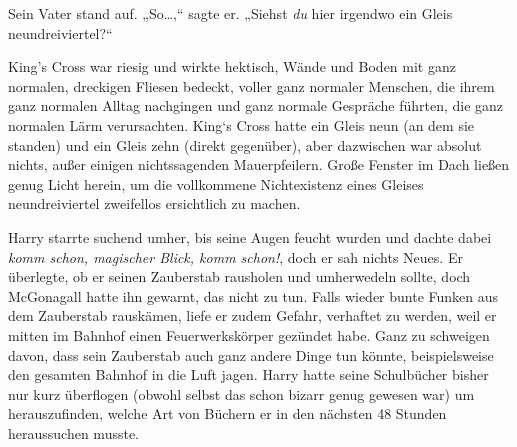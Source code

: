 Sein Vater stand auf. „So…,“ sagte er. „Siehst \emph{du} hier irgendwo ein Gleis neundreiviertel?“

King’s Cross war riesig und wirkte hektisch, Wände und Boden mit ganz normalen, dreckigen Fliesen bedeckt, voller ganz normaler Menschen, die ihrem ganz normalen Alltag nachgingen und ganz normale Gespräche führten, die ganz normalen Lärm verursachten. King‘s Cross hatte ein Gleis neun (an dem sie standen) und ein Gleis zehn (direkt gegenüber), aber dazwischen war absolut nichts, außer einigen nichtssagenden Mauerpfeilern. Große Fenster im Dach ließen genug Licht herein, um die vollkommene Nichtexistenz eines Gleises neundreiviertel zweifellos ersichtlich zu machen.

Harry starrte suchend umher, bis seine Augen feucht wurden und dachte dabei \emph{komm schon, magischer Blick, komm schon!}, doch er sah nichts Neues. Er überlegte, ob er seinen Zauberstab rausholen und umherwedeln sollte, doch McGonagall hatte ihn gewarnt, das nicht zu tun. Falls wieder bunte Funken aus dem Zauberstab rauskämen, liefe er zudem Gefahr, verhaftet zu werden, weil er mitten im Bahnhof einen Feuerwerkskörper gezündet habe. Ganz zu schweigen davon, dass sein Zauberstab auch ganz andere Dinge tun könnte, beispielsweise den gesamten Bahnhof in die Luft jagen. Harry hatte seine Schulbücher bisher nur kurz überflogen (obwohl selbst das schon bizarr genug gewesen war) um herauszufinden, welche Art von Büchern er in den nächsten 48 Stunden heraussuchen musste.


